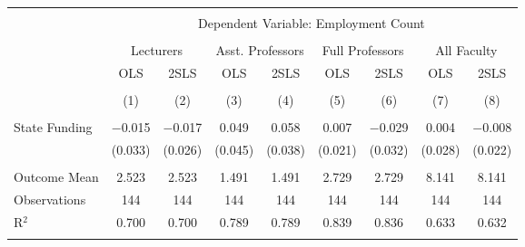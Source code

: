 
\begin{tabular}{@{\extracolsep{5pt}}lcccccccc} 
\\[-1.8ex]\hline 
\hline \\[-1.8ex] 
 & \multicolumn{8}{c}{Dependent Variable: Employment Count} \\ 
\cline{2-9} 
\\[-1.8ex] & \multicolumn{2}{c}{Lecturers} & \multicolumn{2}{c}{Asst. Professors} & \multicolumn{2}{c}{Full Professors} & \multicolumn{2}{c}{All Faculty} \\ 
 & OLS & 2SLS & OLS & 2SLS & OLS & 2SLS & OLS & 2SLS \\ 
\\[-1.8ex] & (1) & (2) & (3) & (4) & (5) & (6) & (7) & (8)\\ 
\hline \\[-1.8ex] 
 State Funding & $-$0.015 & $-$0.017 & 0.049 & 0.058 & 0.007 & $-$0.029 & 0.004 & $-$0.008 \\ 
  & (0.033) & (0.026) & (0.045) & (0.038) & (0.021) & (0.032) & (0.028) & (0.022) \\ 
 \hline \\[-1.8ex] 
Outcome Mean & 2.523 & 2.523 & 1.491 & 1.491 & 2.729 & 2.729 & 8.141 & 8.141 \\ 
Observations & 144 & 144 & 144 & 144 & 144 & 144 & 144 & 144 \\ 
R$^{2}$ & 0.700 & 0.700 & 0.789 & 0.789 & 0.839 & 0.836 & 0.633 & 0.632 \\ 
\hline 
\hline \\[-1.8ex] 
\end{tabular} 
